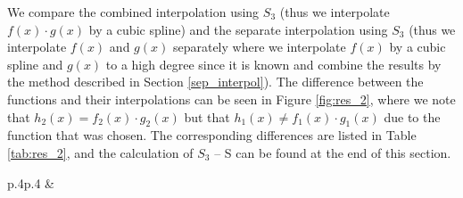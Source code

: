 We compare the combined interpolation using $S_3$ (thus we interpolate $f(x)\cdot g(x)$ by a cubic spline) and the separate interpolation using $S_3$ (thus we interpolate $f(x)$ and $g(x)$ separately where we interpolate $f(x)$ by a cubic spline and $g(x)$ to a high degree since it is known and combine the results by the method described in Section \ref{sep_interpol}).
The difference between the functions and their interpolations can be seen in Figure \ref{fig:res_2}, where we note that $h_2(x) = f_2(x)\cdot g_2(x)$ but that $h_1(x) \neq f_1(x)\cdot g_1(x)$ due to the function that was chosen.
The corresponding differences are listed in Table \ref{tab:res_2}, and the calculation of $S_3$ -- S can be found at the end of this section.
\begin{table}[H]
    \centering
    \begin{tabular}{p{}p{}}
         &
    \end{tabular}
    \vspace{-.2em}
    \caption{The absolute difference and the relative difference between the integral and the correct integral using combined and separate interpolation techniques. For the functions we used $f_1(x)\cdot g_1(x)$ on the left-hand side and $f_2(x)\cdot g_2(x)$ on the right-hand side, see the caption of Figure \ref{fig:res_2} for the corresponding functions.}
    \label{tab:res_2}
    \vspace{-.5em}
\end{table}

